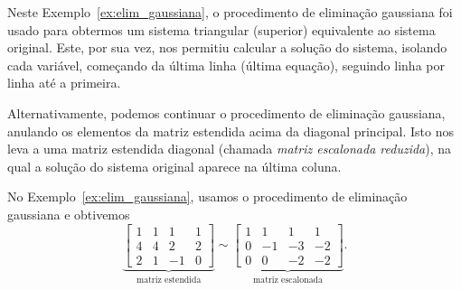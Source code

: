 Neste Exemplo~\ref{ex:elim_gaussiana}, o procedimento de eliminação gaussiana foi usado para obtermos um sistema triangular (superior) equivalente ao sistema original. Este, por sua vez, nos permitiu calcular a solução do sistema, isolando cada variável, começando da última linha (última equação), seguindo linha por linha até a primeira.

Alternativamente, podemos continuar o procedimento de eliminação gaussiana, anulando os elementos da matriz estendida acima da diagonal principal. Isto nos leva a uma matriz estendida diagonal (chamada \emph{matriz escalonada reduzida}), na qual a solução do sistema original aparece na última coluna.

\begin{ex}
  No Exemplo~\ref{ex:elim_gaussiana}, usamos o procedimento de eliminação gaussiana e obtivemos
  \begin{equation*}
      \underbrace{
        \begin{bmatrix}
          1 & 1 & 1 & 1\\
          4 & 4 & 2 & 2\\
          2 & 1 & -1 & 0
        \end{bmatrix}
}_{\text{matriz estendida}} \sim
      \underbrace{
        \begin{bmatrix}
          1 & 1 & 1 & 1\\
          0 & -1 & -3 & -2\\
          0 & 0 & -2 & -2
        \end{bmatrix}
}_{\text{matriz escalonada}}.
  \end{equation*}


\end{ex}
